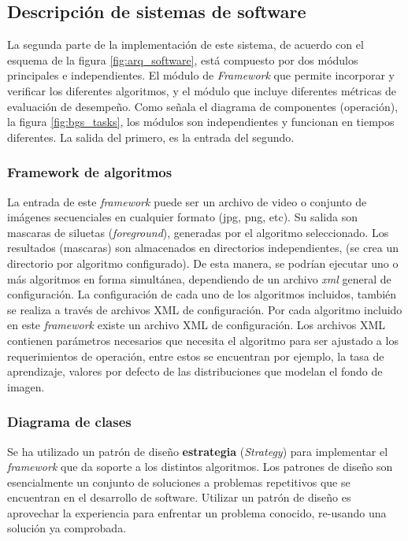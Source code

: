 \subsection{Descripción de sistemas de software}
La segunda parte de la implementación de este sistema, de acuerdo con el esquema de la figura \ref{fig:arq_software}, está compuesto por dos módulos principales e independientes. El módulo de \textit{Framework} que permite incorporar y verificar los diferentes algoritmos, y el módulo que incluye diferentes métricas de evaluación de desempeño. Como señala el diagrama de componentes (operación), la figura \ref{fig:bgs_tasks}, los módulos son independientes y funcionan en tiempos diferentes. La salida del primero, es la entrada del segundo.

\subsubsection{Framework de algoritmos}

La entrada de este \textit{framework} puede ser un archivo de video o  conjunto de imágenes secuenciales en cualquier formato (jpg, png, etc). Su salida son mascaras de siluetas (\textit{foreground}), generadas por el algoritmo seleccionado. Los resultados (mascaras) son almacenados en directorios independientes, (se crea un directorio por algoritmo configurado). De esta manera, se podrían ejecutar uno o más algoritmos en forma simultánea, dependiendo de un archivo \textit{xml} general de configuración. La configuración de cada uno de los algoritmos incluidos, también se realiza a través de archivos XML de configuración. Por cada algoritmo incluido en este \textit{framework} existe un archivo XML de configuración. Los archivos XML contienen parámetros necesarios que necesita el algoritmo para ser ajustado a los requerimientos de operación, entre estos se encuentran por ejemplo, la tasa de aprendizaje, valores por defecto de las distribuciones que modelan el fondo de imagen. 


\subsubsection{Diagrama de clases}
Se ha utilizado un patrón de diseño \cite{gamma_design_1995} \textbf{estrategia} (\textit{Strategy}) para implementar el \textit{framework} que da soporte a los distintos algoritmos.  Los patrones de diseño\cite{gamma_design_1995} son esencialmente un conjunto de soluciones a problemas repetitivos que se encuentran en el desarrollo de software. Utilizar un patrón de diseño es aprovechar la experiencia para enfrentar un problema conocido, re-usando una solución ya comprobada. 

